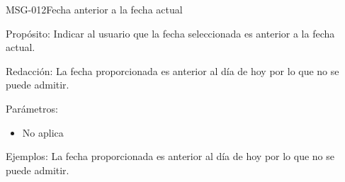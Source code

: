 \begin{cdtMessage}[msgErrorColor]{MSG-012}{Fecha anterior a la fecha actual} 
	\item[Propósito:] Indicar al usuario que la fecha seleccionada es anterior a la fecha actual.
	\item[Redacción:] La fecha proporcionada es anterior al día de hoy por lo que no se puede admitir.
	\item[Parámetros:] \hspace{1cm}
	\begin{itemize}
		\item No aplica
	\end{itemize}
	\item[Ejemplos:]  La fecha proporcionada es anterior al día de hoy por lo que no se puede admitir.
\end{cdtMessage}